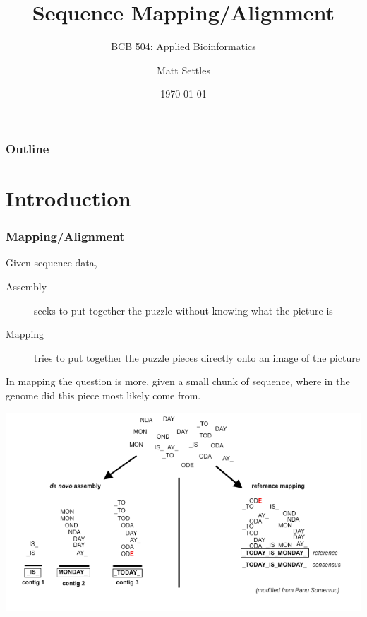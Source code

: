 \documentclass[pdf]{beamer}
\begin{document}
\title[Sequence Mapping]{Sequence Mapping/Alignment}
\subtitle{BCB 504: Applied Bioinformatics\\}
\author[Matt Settles]{Matt Settles}
\date{\today}


\begin{frame}[plain]
  \titlepage
\end{frame}


\begin{frame}[plain] 
  \frametitle{Outline}
  \tableofcontents
\end{frame}

\section{Introduction}
\begin{frame}
  \frametitle{Mapping/Alignment}
Given sequence data,
\begin{description}
\item[Assembly]  seeks to put together the puzzle without knowing what the picture is 
\item[Mapping]  tries to put together the puzzle pieces directly onto an image of the picture
\end{description}
In mapping the question is more, given a small chunk of sequence, where in the genome did this piece most likely come from.
\end{frame}

\begin{frame}
\begin{center}
\includegraphics[scale=0.35]{Figures/Differences.png} 
\end{center}
\end{frame}
\end{document}
